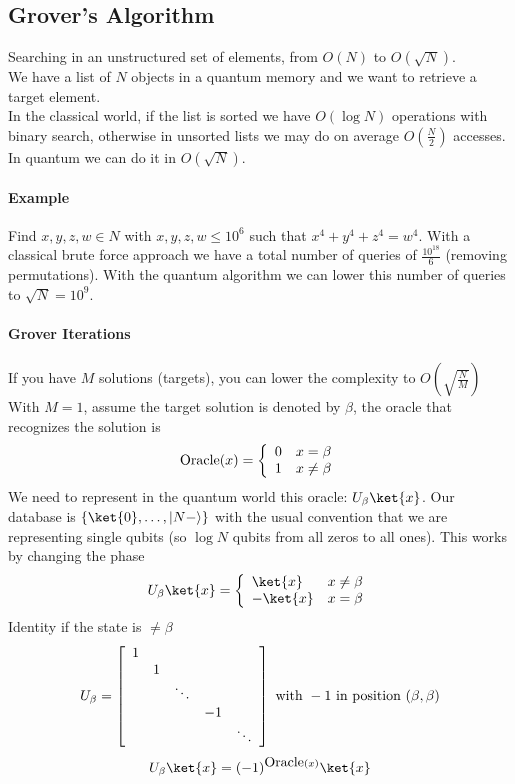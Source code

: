 \documentclass[10pt]{report}
\begin{document}
\subsection{Grover's Algorithm} 
Searching in an unstructured set of elements, from $O(N)$ to $O(\sqrt{N})$.\\We have a list of $N$ objects in a quantum memory and we want to retrieve a target element.\\
In the classical world, if the list is sorted we have $O(\log N)$ operations with binary search, otherwise in unsorted lists we may do on average $O(\frac{N}{2})$ accesses. In quantum we can do it in $O(\sqrt{N})$.
\paragraph{Example} Find $x,y,z,w\in N$ with $x,y,z,w\leq 10^6$ such that $x^4+y^4+z^4=w^4$. With a classical brute force approach we have a total number of queries of $\frac{10^{18}}{6}$ (removing permutations). With the quantum algorithm we can lower this number of queries to $\sqrt{N} = 10^9$.
\paragraph{Grover Iterations} If you have $M$ solutions (targets), you can lower the complexity to $O\left(\sqrt{\frac{N}{M}}\right)$\\
With $M=1$, assume the target solution is denoted by $\beta$, the oracle that recognizes the solution is $$\hbox{Oracle}(x) = \left\{\begin{array}{c l}
0&x=\beta\\1&x\neq\beta
\end{array}\right.$$
We need to represent in the quantum world this oracle: $U_\beta\ket{x}$. Our database is $\{\ket{0},\ldots,|N-\rangle\}$ with the usual convention that we are representing single qubits (so $\log N$ qubits from all zeros to all ones). This works by changing the phase
$$U_\beta\ket{x}=\left\{\begin{array}{l l}
\ket{x}&x\neq\beta\\-\ket{x}&x=\beta
\end{array}\right.$$
Identity if the state is $\neq\beta$
$$U_\beta = \left[\begin{array}{c c c c c}
1\\
&1\\
& &\ddots\\
& & &-1\\
& & & &\ddots\\
\end{array}\right]\hbox{ with }-1\hbox{ in position }(\beta,\beta)$$
$$U_\beta\ket{x}=(-1)^{\hbox{Oracle}(x)}\ket{x}$$
\end{document}
